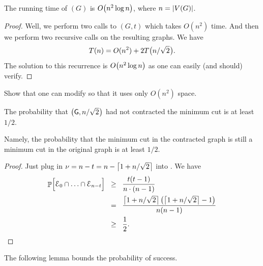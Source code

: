 


\begin{lemma}
    The running time of \FastCut{}$(G)$ is $O\pth{n^{2}\log n}$, where
    $n=\left| {V(G)} \right|$.
    
\end{lemma}
\begin{proof}
    Well, we perform two calls to \Contract{}$(G,t)$ which takes
    $O(n^{2})$ time. And then we perform two recursive calls on the
    resulting graphs.  We have
    \begin{equation*}
        T(n)=O(n^{2}) + 2 T\bigl(  n/ \sqrt{2} \hspace{0.6pt} \bigr).
    \end{equation*}
    The solution to this recurrence is $O\pth{n^{2}\log n}$ as one can
    easily (and should) verify.
\end{proof}



\begin{exercise}
    Show that one can modify \FastCut{} so that it uses only
    $O(n^{2})$ space.
\end{exercise}

\begin{lemma}
    The probability that
    \Contract{}$\bigl( \mathsf{G}, n/\sqrt{2} \hspace{0.6pt} \bigr)$ had not
    contracted the minimum cut is at least $1/2$.
    
    Namely, the probability that the minimum cut in the contracted
    graph is still a minimum cut in the original graph is at least
    $1/2$.
    
\end{lemma}
\begin{proof}
    Just plug in $\nu= n -t = n - \left\lceil {1 + n/\sqrt{2} } \right\rceil$ into
    . We have
    \begin{align*}
        \Prob{\Bigl. \Event_{0}\cap\ldots\cap\Event_{n-t}}
        &\GEQ%
        \frac{t(t-1)}{n\cdot(n-1)}
        \\&
        \EQ%
        \frac{\ceil{1 + n/\sqrt{2} }
           \pth{ \ceil{1 + n/\sqrt{2} } - 1}}{n(n-1)}
        \\&
        \GEQ
        \frac{1}{2}.
    \end{align*}
\end{proof}

The following lemma bounds the probability of success. 

